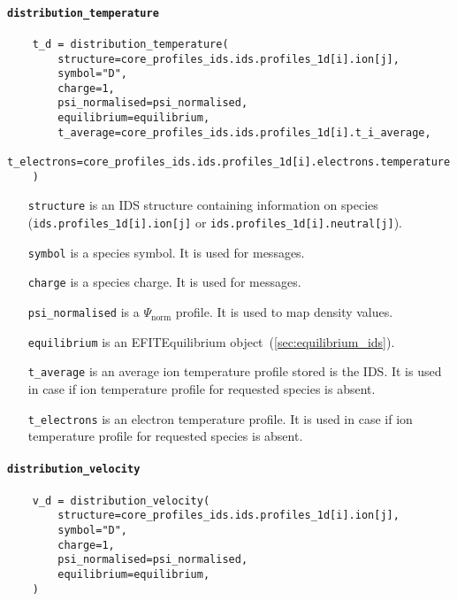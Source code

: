 \documentclass[../../main.tex]{subfiles}
\begin{document}
\paragraph{\texttt{distribution\_temperature}}%

\begin{verbatim}
    t_d = distribution_temperature(
        structure=core_profiles_ids.ids.profiles_1d[i].ion[j],
        symbol="D",
        charge=1,
        psi_normalised=psi_normalised,
        equilibrium=equilibrium,
        t_average=core_profiles_ids.ids.profiles_1d[i].t_i_average,
        t_electrons=core_profiles_ids.ids.profiles_1d[i].electrons.temperature
    )
\end{verbatim}

\begin{itemize}[align=left]
    \item[\texttt{structure}] is an IDS structure containing information on species (\texttt{ids.profiles\_1d[i].ion[j]} or \texttt{ids.profiles\_1d[i].neutral[j]}).
    \item[\texttt{symbol}] is a species symbol. It is used for messages.
    \item[\texttt{charge}] is a species charge. It is used for messages.
    \item[\texttt{psi\_normalised}] is a $\Psi_\text{norm}$ profile. It is used to map density values.
    \item[\texttt{equilibrium}] is an EFITEquilibrium object~(\cref{sec:equilibrium_ids}).
    \item[\texttt{t\_average}] is an average ion temperature profile stored is the IDS. It is used in case if ion temperature profile for requested species is absent.
    \item[\texttt{t\_electrons}] is an electron temperature profile. It is used in case if ion temperature profile for requested species is absent.
\end{itemize}

\paragraph{\texttt{distribution\_velocity}}%

\begin{verbatim}
    v_d = distribution_velocity(
        structure=core_profiles_ids.ids.profiles_1d[i].ion[j],
        symbol="D",
        charge=1,
        psi_normalised=psi_normalised,
        equilibrium=equilibrium,
    )
\end{verbatim}
\end{document}
